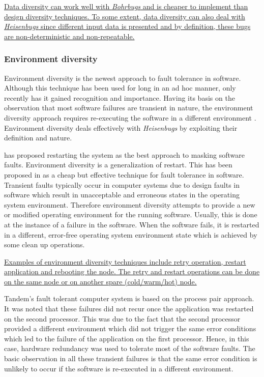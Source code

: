 \documentclass[a4paper, 11pt]{article}
\begin{document}
\ul{Data diversity can work well with \emph{Bohrbugs} and is cheaper to implement than design diversity techniques. To some extent, data diversity can also deal with \emph{Heisenbugs} since different input data is presented and by definition, these bugs are non-deterministic and non-repeatable.}

\subsubsection{Environment diversity}
\label{sec:envdiv}
Environment diversity is the newest approach to fault tolerance in software. Although this technique has been used for long in an ad hoc manner, only recently has it gained recognition and importance. Having its basis on the observation that most software failures are transient in nature, the environment diversity approach requires re-executing the software in a different environment \citep{jalote1995framework}. Environment diversity deals effectively with \emph{Heisenbugs} by exploiting their definition and nature.

\citet{adams1984optimizing} has proposed restarting the system as the best approach to masking software faults. Environment diversity is a generalization of restart. This has been proposed in \citep{huang1994two} as a cheap but effective technique for fault tolerance in software. Transient faults typically occur in computer systems due to design faults in software which result in unacceptable and erroneous states in the operating system environment. Therefore environment diversity attempts to provide a new or modified operating environment for the running software. Usually, this is done at the instance of a failure in the software. When the software fails, it is restarted in a different, error-free operating system environment state which is achieved by some clean up operations.

\ul{Examples of environment diversity techniques include retry operation, restart application and rebooting the node. The retry and restart operations can be done on the same node or on another spare (cold/warm/hot) node.}

Tandem's fault tolerant computer system \citep{lee1995software} is based on the process pair approach. It was noted that these failures did not recur once the application was restarted on the second processor. This was due to the fact that the second processor provided a different environment which did not trigger the same error conditions which led to the failure of the application on the first processor. Hence, in this case, hardware redundancy was used to tolerate most of the software faults. The basic observation in all these transient failures is that the same error condition is unlikely to occur if the software is re-executed in a different environment.
\end{document}
